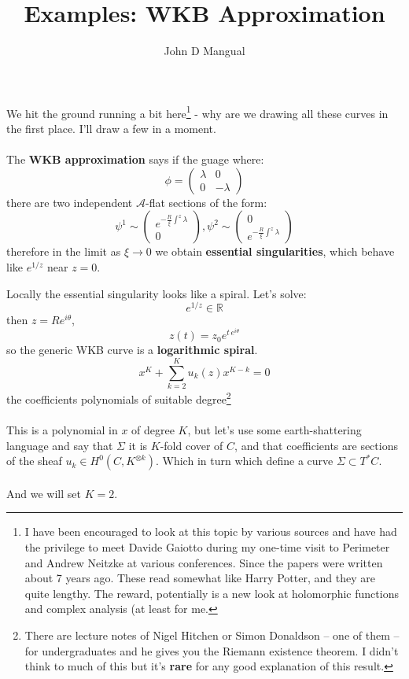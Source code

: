 \documentclass[12pt]{article}
\title{\textbf{ Examples:  WKB Approximation }}
\author{John D Mangual}
\date{}
\begin{document}
\selectfont \fontsize{25}{30}\selectfont

\maketitle

\noindent We hit the ground running a bit here\footnote{I have been encouraged to look at this topic by various sources and have had the privilege to meet Davide Gaiotto during my one-time visit to Perimeter and Andrew Neitzke at various conferences.  Since the papers were written about 7 years ago.  These read somewhat like Harry Potter, and they are quite lengthy.  The reward, potentially is a new look at holomorphic functions and complex analysis (at least for me.} - why are we drawing all these curves in the first place.  I'll draw a few in a moment.  \\ \\
The \textbf{WKB approximation} says if the guage where:
$$ \phi = \left( \begin{array}{cc} 
\lambda & 0 \\ 0 & -\lambda \end{array} \right) $$
there are two independent $\mathcal{A}$-flat sections of the form:
$$\psi^1 \sim \left( \begin{array}{c} 
e^{- \frac{R}{\xi} \int^z \lambda } \\ 0 \end{array} \right), 
\psi^2 \sim \left( \begin{array}{c} 0 \\ 
e^{- \frac{R}{\xi} \int^z \lambda }\end{array} \right) $$
therefore in the limit as $\xi \to 0$ we obtain \textbf{essential singularities}, which behave like $e^{1/z}$ near $z = 0$. 

\newpage

\noindent Locally the essential singularity looks like a spiral.  Let's solve:
$$ e^{1/z} \in \mathbb{R} $$
then $z = R e^{i\theta}$, 
$$ z(t) = z_0 e^{t\, e^{i\theta}} $$
so the generic WKB curve is a \textbf{logarithmic spiral}.
$$ x^K + \sum_{k=2}^K u_k(z) x^{K-k} = 0$$
the coefficients polynomials of suitable degree\footnote{There are lecture notes of Nigel Hitchen or Simon Donaldson -- one of them -- for undergraduates and he gives you the Riemann existence theorem.  I didn't think to much of this but it's \textbf{rare} for any good explanation of this result.} \\ \\
This is a polynomial in $x$ of degree $K$, but let's use some earth-shattering language and say that $\Sigma$ it is $K$-fold cover of $C$, and that coefficients are sections of the sheaf $u_k \in H^0(C, K^{\otimes k})$.  Which in turn which define a curve $\Sigma \subset T^\ast C$. \\ \\ 
And we will set $K = 2$.
\newpage
\end{document}

